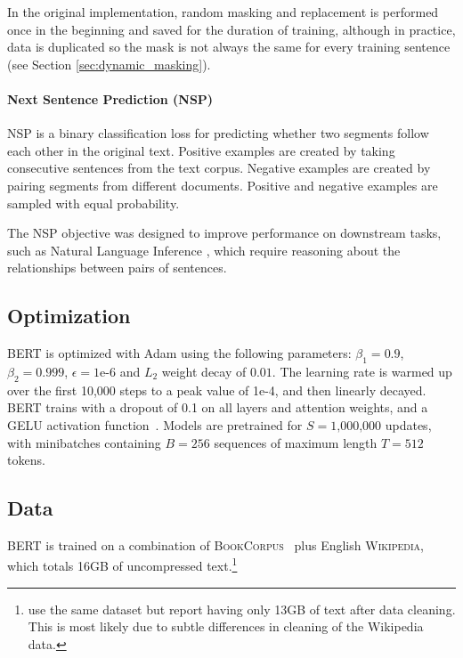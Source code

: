 In the original implementation, random masking and replacement is performed once in the beginning and saved for the duration of training, although in practice, data is duplicated so the mask is not always the same for every training sentence (see Section \ref{sec:dynamic_masking}).

\paragraph{Next Sentence Prediction (NSP)} NSP is a binary classification loss for predicting whether two segments follow each other in the original text. Positive examples are created by taking consecutive sentences from the text corpus. Negative examples are created by pairing segments from different documents. Positive and negative examples are sampled with equal probability. 
    
The NSP objective was designed to improve performance on downstream tasks, such as Natural Language Inference \cite{bowman2015large}, which require reasoning about the relationships between pairs of sentences. 








\subsection{Optimization}

BERT is optimized with Adam \cite{kingma2014adam} using the following parameters: $\beta_1 = 0.9$, $\beta_2= 0.999$, $\epsilon = \text{1e-6}$ and $L_2$ weight decay of $0.01$. The learning rate is warmed up over the first 10,000 steps to a peak value of 1e-4, and then linearly decayed. BERT trains with a dropout of 0.1 on all layers and attention weights, and a GELU activation function~\cite{hendrycks2016gelu}. Models are pretrained for $S=\text{1,000,000}$ updates, with minibatches containing $B=\text{256}$ sequences of maximum length $T=\text{512}$ tokens.

\subsection{Data}

BERT is trained on a combination of \textsc{BookCorpus}~\cite{moviebook} plus English \textsc{Wikipedia}, which totals 16GB of uncompressed text.\footnote{ use the same dataset but report having only 13GB of text after data cleaning. This is most likely due to subtle differences in cleaning of the Wikipedia data.}

